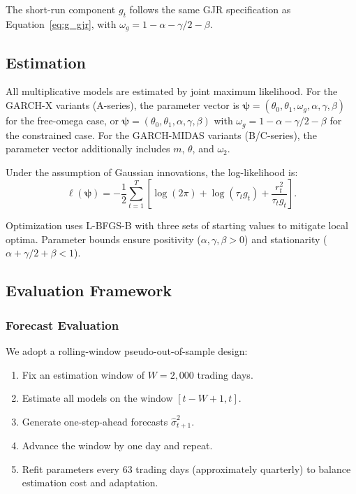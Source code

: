 \documentclass[12pt,a4paper]{article}
\newcommand{\bm}[1]{\boldsymbol{#1}}
\begin{document}
The short-run component $g_t$ follows the same GJR specification as Equation~\eqref{eq:g_gjr}, with $\omega_g = 1 - \alpha - \gamma/2 - \beta$.

\subsection{Estimation}
\label{sec:estimation}

All multiplicative models are estimated by joint maximum likelihood. For the GARCH-X variants (A-series), the parameter vector is $\bm{\psi} = (\theta_0, \theta_1, \omega_g, \alpha, \gamma, \beta)$ for the free-omega case, or $\bm{\psi} = (\theta_0, \theta_1, \alpha, \gamma, \beta)$ with $\omega_g = 1 - \alpha - \gamma/2 - \beta$ for the constrained case. For the GARCH-MIDAS variants (B/C-series), the parameter vector additionally includes $m$, $\theta$, and $\omega_2$.

Under the assumption of Gaussian innovations, the log-likelihood is:
\begin{equation}
\ell(\bm{\psi}) = -\frac{1}{2}\sum_{t=1}^{T} \left[\log(2\pi) + \log(\tau_t g_t) + \frac{r_t^2}{\tau_t g_t}\right].
\label{eq:loglik}
\end{equation}

Optimization uses L-BFGS-B with three sets of starting values to mitigate local optima. Parameter bounds ensure positivity ($\alpha, \gamma, \beta > 0$) and stationarity ($\alpha + \gamma/2 + \beta < 1$).

\subsection{Evaluation Framework}
\label{sec:evaluation}

\subsubsection{Forecast Evaluation}

We adopt a rolling-window pseudo-out-of-sample design:
\begin{enumerate}
\item Fix an estimation window of $W = 2{,}000$ trading days.
\item Estimate all models on the window $[t-W+1, t]$.
\item Generate one-step-ahead forecasts $\hat{\sigma}_{t+1}^2$.
\item Advance the window by one day and repeat.
\item Refit parameters every 63 trading days (approximately quarterly) to balance estimation cost and adaptation.
\end{enumerate}
\end{document}
